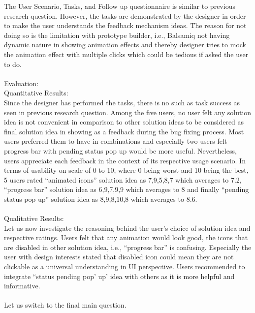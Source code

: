 The User Scenario, Tasks, and Follow up questionnaire is similar to previous research question. However, the tasks are demonstrated by the designer in order to make the user understands the feedback mechanism ideas. The reason for not doing so is the limitation with prototype builder, i.e., Balsamiq not having dynamic nature in showing animation effects and thereby designer tries to mock the animation effect with multiple clicks which could be tedious if asked the user to do. \\ \\

Evaluation: \\ 

Quantitative Results: \\

Since the designer has performed the tasks, there is no such as task success as seen in previous research question. Among the five users, no user felt any solution idea is not convenient in comparison to other solution ideas to be considered as final solution idea in showing as a feedback during the bug fixing process.  Most users preferred them to have in combinations and especially two users felt progress bar with pending status pop up would be more useful. Nevertheless, users appreciate each feedback in the context of its respective usage scenario. In terms of usability on scale of 0 to 10, where 0 being worst and 10 being the best, 5 users rated “animated icons” solution idea as 7,9,5,8,7 which averages to 7.2, “progress bar” solution idea as 6,9,7,9,9 which averages to 8 and finally “pending status pop up” solution idea as 8,9,8,10,8 which averages to 8.6. \\ \\

Qualitative Results: \\

Let us now investigate the reasoning behind the user’s choice of solution idea and respective ratings. Users felt that any animation would look good, the icons that are disabled in other solution idea, i.e., “progress bar” is confusing. Especially the user with design interests stated that disabled icon could mean they are not clickable as a universal understanding in UI perspective. Users recommended to integrate “status pending pop’ up’ idea with others as it is more helpful and informative. \\ \\

Let us switch to the final main question. \\ \\


